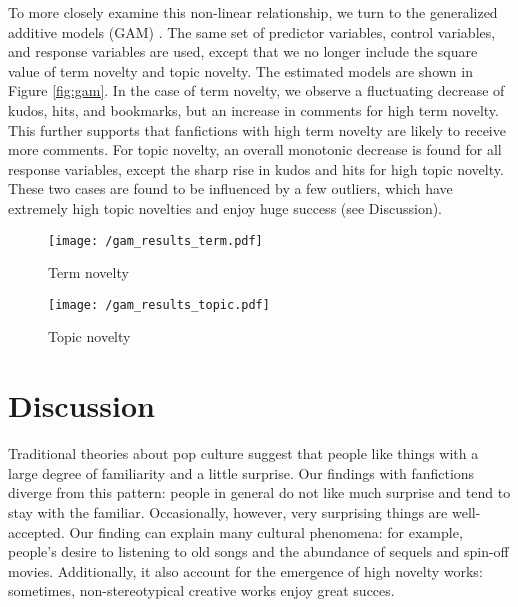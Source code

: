 \documentclass[letterpaper]{article} %
\begin{document}
To more closely examine this non-linear relationship, we turn to the generalized additive models (GAM) \cite{wood2006generalized}. The same set of predictor variables, control variables, and response variables are used, except that we no longer include the square value of term novelty and topic novelty. The estimated models are shown in Figure \ref{fig:gam}. In the case of term novelty, we observe a fluctuating decrease of kudos, hits, and bookmarks, but an increase in comments for high term novelty. This further supports that fanfictions with high term novelty are likely to receive more comments. For topic novelty, an overall monotonic decrease is found for all response variables, except the sharp rise in kudos and hits for high topic novelty. These two cases are found to be influenced by a few outliers, which have extremely high topic novelties and enjoy huge success (see Discussion). 

\begin{figure*}
    \centering
    \begin{subfigure}{\textwidth}
          \texttt{[image: /gam\_results\_term.pdf]}
  		\caption{Term novelty} 
			\label{fig:gam_term}
       \end{subfigure}
      \begin{subfigure}{\textwidth}
          \texttt{[image: /gam\_results\_topic.pdf]}
		\caption{Topic novelty} 
		\label{fig:gam_topic}
       \end{subfigure}
           	\caption{Results of the Generalized Additive Models. 95\% confidence intervals are plotted.}
        \label{fig:gam}
\end{figure*}



\section*{Discussion}
Traditional theories about pop culture suggest that people like things with a large degree of familiarity and a little surprise. Our findings with fanfictions diverge from this pattern: people in general do not like much surprise and tend to stay with the familiar. Occasionally, however, very surprising things are well-accepted. Our finding can explain many cultural phenomena: for example, people's desire to listening to old songs and the abundance of sequels and spin-off movies. Additionally, it also account for the emergence of high novelty works: sometimes, non-stereotypical creative works enjoy great succes.
\end{document}
